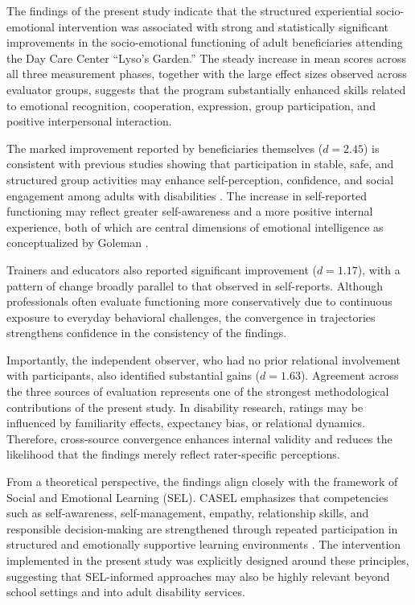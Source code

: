 \documentclass[journal]{IEEEtran}
\begin{document}
The findings of the present study indicate that the structured experiential socio-emotional intervention was associated with strong and statistically significant improvements in the socio-emotional functioning of adult beneficiaries attending the Day Care Center ``Lyso's Garden.'' The steady increase in mean scores across all three measurement phases, together with the large effect sizes observed across evaluator groups, suggests that the program substantially enhanced skills related to emotional recognition, cooperation, expression, group participation, and positive interpersonal interaction.

The marked improvement reported by beneficiaries themselves ($d = 2.45$) is consistent with previous studies showing that participation in stable, safe, and structured group activities may enhance self-perception, confidence, and social engagement among adults with disabilities \cite{hall2009,verdonschot2009}. The increase in self-reported functioning may reflect greater self-awareness and a more positive internal experience, both of which are central dimensions of emotional intelligence as conceptualized by Goleman \cite{goleman1995}.

Trainers and educators also reported significant improvement ($d = 1.17$), with a pattern of change broadly parallel to that observed in self-reports. Although professionals often evaluate functioning more conservatively due to continuous exposure to everyday behavioral challenges, the convergence in trajectories strengthens confidence in the consistency of the findings.

Importantly, the independent observer, who had no prior relational involvement with participants, also identified substantial gains ($d = 1.63$). Agreement across the three sources of evaluation represents one of the strongest methodological contributions of the present study. In disability research, ratings may be influenced by familiarity effects, expectancy bias, or relational dynamics. Therefore, cross-source convergence enhances internal validity and reduces the likelihood that the findings merely reflect rater-specific perceptions.

From a theoretical perspective, the findings align closely with the framework of Social and Emotional Learning (SEL). CASEL emphasizes that competencies such as self-awareness, self-management, empathy, relationship skills, and responsible decision-making are strengthened through repeated participation in structured and emotionally supportive learning environments \cite{casel2020,weissberg2015}. The intervention implemented in the present study was explicitly designed around these principles, suggesting that SEL-informed approaches may also be highly relevant beyond school settings and into adult disability services.
\end{document}
